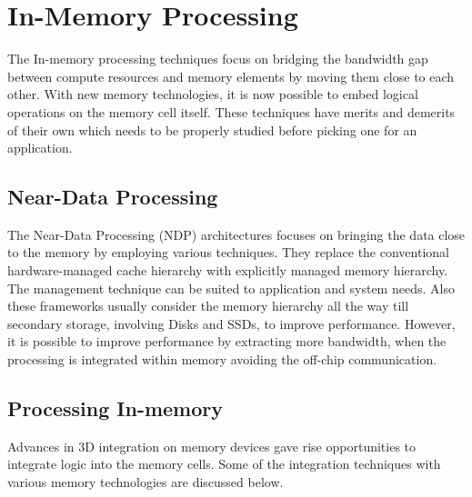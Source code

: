 \section{In-Memory Processing}
The In-memory processing techniques focus on bridging the bandwidth gap between compute resources and memory elements by moving them close to each other. With new memory technologies, it is now possible to embed logical operations on the memory cell itself. These techniques have merits and demerits of their own which needs to be properly studied before picking one for an application.

  \subsection{Near-Data Processing}
  The Near-Data Processing (NDP) architectures\cite{Biscuit, Graphicionado} focuses on bringing the data close to the memory by employing various techniques. They replace the conventional hardware-managed cache hierarchy with explicitly managed memory hierarchy. The management technique can be suited to application and system needs. Also these frameworks usually consider the memory hierarchy all the way till secondary storage, involving Disks and SSDs, to improve performance. However, it is possible to improve performance by extracting more bandwidth, when the processing is integrated within memory avoiding the off-chip communication.
  
  \subsection{Processing In-memory}
  Advances in 3D integration on memory devices gave rise opportunities to integrate logic into the memory cells. Some of the integration techniques with various memory technologies are discussed below.
  
